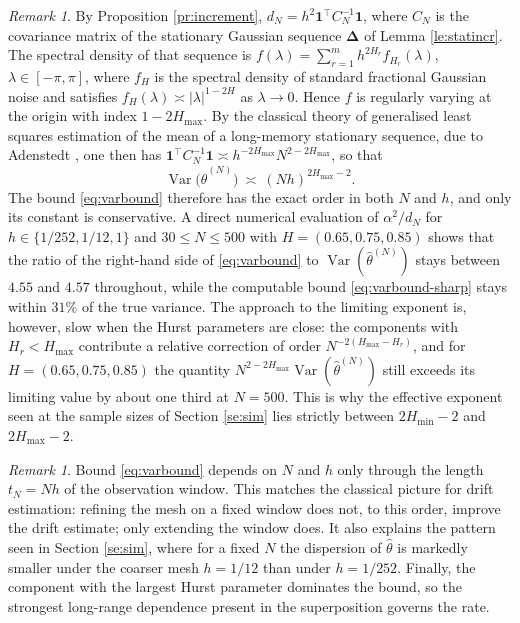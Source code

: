 \documentclass[11pt,reqno]{amsart}
\numberwithin{equation}{section}
\theoremstyle{plain}
\theoremstyle{definition}
\theoremstyle{remark}
\newtheorem{remark}[theorem]{Remark}
\newcommand{\bDelta}{\boldsymbol{\Delta}}
\newcommand{\bone}{\mathbf{1}}
\newcommand{\Hmax}{H_{\max}}
\newcommand{\Hmin}{H_{\min}}
\DeclareMathOperator{\Var}{Var}
\begin{document}
\begin{remark}\label{re:sharp}
By Proposition \ref{pr:increment}, $d_N=h^{2}\bone^{\top}C_N^{-1}\bone$, where $C_N$ is
the covariance matrix of the stationary Gaussian sequence $\bDelta$ of
Lemma \ref{le:statincr}. The spectral density of that sequence is
$f(\lambda)=\sum_{r=1}^{m}h^{2H_r}f_{H_r}(\lambda)$, $\lambda\in[-\pi,\pi]$, where
$f_{H}$ is the spectral density of standard fractional Gaussian noise and satisfies
$f_{H}(\lambda)\asymp|\lambda|^{1-2H}$ as $\lambda\to0$. Hence $f$ is regularly varying
at the origin with index $1-2\Hmax$. By the classical theory of generalised least
squares estimation of the mean of a long-memory stationary sequence, due to Adenstedt
\cite{Ade74}, one then has
$\bone^{\top}C_N^{-1}\bone\asymp h^{-2\Hmax}N^{2-2\Hmax}$, so that
\[
  \Var\bigl(\widehat\theta^{(N)}\bigr)\ \asymp\ (Nh)^{2\Hmax-2}.
\]
The bound \eqref{eq:varbound} therefore has the exact order in both $N$ and $h$, and only
its constant is conservative. A direct numerical evaluation of $\alpha^{2}/d_N$ for
$h\in\{1/252,1/12,1\}$ and $30\le N\le500$ with $H=(0.65,0.75,0.85)$ shows that the ratio
of the right-hand side of \eqref{eq:varbound} to $\Var(\widehat\theta^{(N)})$ stays
between $4.55$ and $4.57$ throughout, while the computable bound
\eqref{eq:varbound-sharp} stays within $31\%$ of the true variance. The approach to the
limiting exponent is, however, slow when the Hurst parameters are close: the components
with $H_r<\Hmax$ contribute a relative correction of order $N^{-2(\Hmax-H_r)}$, and for
$H=(0.65,0.75,0.85)$ the quantity $N^{2-2\Hmax}\Var(\widehat\theta^{(N)})$ still exceeds
its limiting value by about one third at $N=500$. This is why the effective exponent seen
at the sample sizes of Section \ref{se:sim} lies strictly between $2\Hmin-2$ and
$2\Hmax-2$.
\end{remark}

\begin{remark}\label{re:window}
Bound \eqref{eq:varbound} depends on $N$ and $h$ only through the length $t_N=Nh$ of the
observation window. This matches the classical picture for drift estimation: refining the
mesh on a fixed window does not, to this order, improve the drift estimate; only
extending the window does. It also explains the pattern seen in Section \ref{se:sim},
where for a fixed $N$ the dispersion of $\widehat\theta$ is markedly smaller under the
coarser mesh $h=1/12$ than under $h=1/252$. Finally, the component with the largest Hurst
parameter dominates the bound, so the strongest long-range dependence present in the
superposition governs the rate.
\end{remark}
\end{document}
